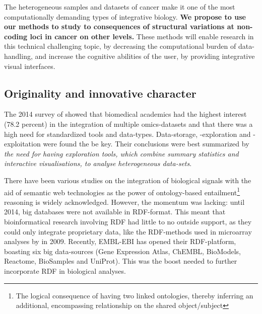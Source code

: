 \documentclass[twoside,fontsize=10pt]{article}
\begin{document}
\noindent 
The heterogeneous samples and datasets of cancer make it one of the most computationally demanding types of integrative biology. \textbf{We propose to use our methods to study to consequences of structural variations at non-coding loci in cancer on other levels.}  These methods will enable research in this technical challenging topic, by decreasing the computational burden of data-handling, and increase the cognitive abilities of the user, by providing integrative visual interfaces. 



%



\subsection*{Originality and innovative character} 
The 2014 survey of \citet{Gomez-Cabrero2014} showed that biomedical academics had the highest interest (78.2 percent) in the integration of multiple omics-datasets and that there was a high need for standardized tools and data-types. Data-storage, -exploration and -exploitation were found the be key. Their conclusions were best summarized by \textit{the need for having exploration tools, which combine summary statistics and interactive visualisations, to analyse heterogeneous data-sets}.
\medskip

\noindent
There have been various studies on the integration of biological signals with the aid of semantic web technologies as the power of ontology-based entailment\footnote{The logical consequence of having two linked ontologies, thereby inferring an additional, encompassing relationship on the shared object/subject} reasoning is widely acknowledged\cite{Sahoo2008}. However, the momentum was lacking: until 2014, big databases were not available in RDF-format. This meant that bioinformatical research involving RDF had little to no outside support, as they could only integrate proprietary data, like the RDF-methods used in microarray analyses by \citet{Szpakowski2009} in 2009. Recently, EMBL-EBI has opened their RDF-platform, boasting six big data-sources (Gene Expression Atlas, ChEMBL, BioModels, Reactome, BioSamples and UniProt)\cite{Jupp2014}. This was the boost needed to further incorporate RDF in biological analyses.
\end{document}
